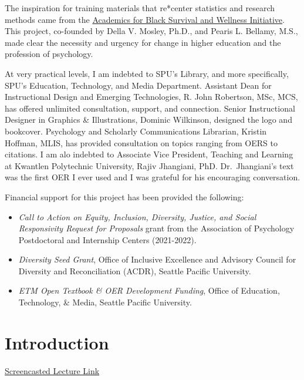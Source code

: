 \documentclass[
  11pt,
]{book}
\providecommand{\tightlist}{%
  \setlength{\itemsep}{0pt}\setlength{\parskip}{0pt}}
\begin{document}
The inspiration for training materials that re*center statistics and research methods came from the \href{https://www.academics4blacklives.com/}{Academics for Black Survival and Wellness Initiative}. This project, co-founded by Della V. Mosley, Ph.D., and Pearis L. Bellamy, M.S., made clear the necessity and urgency for change in higher education and the profession of psychology.

At very practical levels, I am indebted to SPU's Library, and more specifically, SPU's Education, Technology, and Media Department. Assistant Dean for Instructional Design and Emerging Technologies, R. John Robertson, MSc, MCS, has offered unlimited consultation, support, and connection. Senior Instructional Designer in Graphics \& Illustrations, Dominic Wilkinson, designed the logo and bookcover. Psychology and Scholarly Communications Librarian, Kristin Hoffman, MLIS, has provided consultation on topics ranging from OERS to citations. I am alo indebted to Associate Vice President, Teaching and Learning at Kwantlen Polytechnic University, Rajiv Jhangiani, PhD. Dr.~Jhangiani's text \citeyearpar{jhangiani_research_2019} was the first OER I ever used and I was grateful for his encouraging conversation.

Financial support for this project has been provided the following:

\begin{itemize}
\tightlist
\item
  \emph{Call to Action on Equity, Inclusion, Diversity, Justice, and Social Responsivity Request for Proposals} grant from the Association of Psychology Postdoctoral and Internship Centers (2021-2022).
\item
  \emph{Diversity Seed Grant}, Office of Inclusive Excellence and Advisory Council for Diversity and Reconciliation (ACDR), Seattle Pacific University.
\item
  \emph{ETM Open Textbook \& OER Development Funding}, Office of Education, Technology, \& Media, Seattle Pacific University.
\end{itemize}

\hypertarget{ReCintro}{%
\chapter{Introduction}\label{ReCintro}}

\href{https://spu.hosted.panopto.com/Panopto/Pages/Viewer.aspx?pid=cc9b7c0d-e5c3-4e4e-a469-acf7013ee761}{Screencasted Lecture Link}
\end{document}
